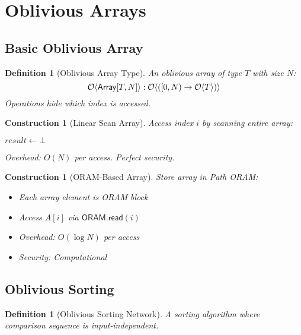 \documentclass[11pt,final]{article}
\newcommand{\Array}{\mathsf{Array}}
\newcommand{\Read}{\mathsf{read}}
\newtheorem{definition}[theorem]{Definition}
\newtheorem{construction}[theorem]{Construction}
\begin{document}
\section{Oblivious Arrays}

\subsection{Basic Oblivious Array}

\begin{definition}[Oblivious Array Type]
An oblivious array of type $T$ with size $N$:
\begin{equation}
\Obv{\Array[T, N]} : \ObvMap{[0, N)}{\Obv{T}}
\end{equation}
Operations hide which index is accessed.
\end{definition}

\begin{construction}[Linear Scan Array]
Access index $i$ by scanning entire array:
\begin{algorithm}[H]
\caption{Linear Scan Read}
$result \gets \bot$\;
\end{algorithm}
Overhead: $O(N)$ per access. Perfect security.
\end{construction}

\begin{construction}[ORAM-Based Array]
Store array in Path ORAM:
\begin{itemize}
    \item Each array element is ORAM block
    \item Access $A[i]$ via $\mathsf{ORAM}.\Read(i)$
    \item Overhead: $O(\log N)$ per access
    \item Security: Computational
\end{itemize}
\end{construction}

\subsection{Oblivious Sorting}

\begin{definition}[Oblivious Sorting Network]
A sorting algorithm where comparison sequence is input-independent.
\end{definition}
\end{document}
